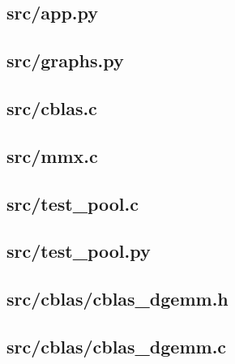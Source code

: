 \subsection{src/app.py}
	
	\newpage

\subsection{src/graphs.py}
	
	\newpage

\subsection{src/cblas.c}
	
	\newpage

\subsection{src/mmx.c}

\newpage

\subsection{src/test\_pool.c}

\newpage

\subsection{src/test\_pool.py}

\newpage

\subsection{src/cblas/cblas\_dgemm.h}
	
	\newpage

\subsection{src/cblas/cblas\_dgemm.c}
	
	\newpage

